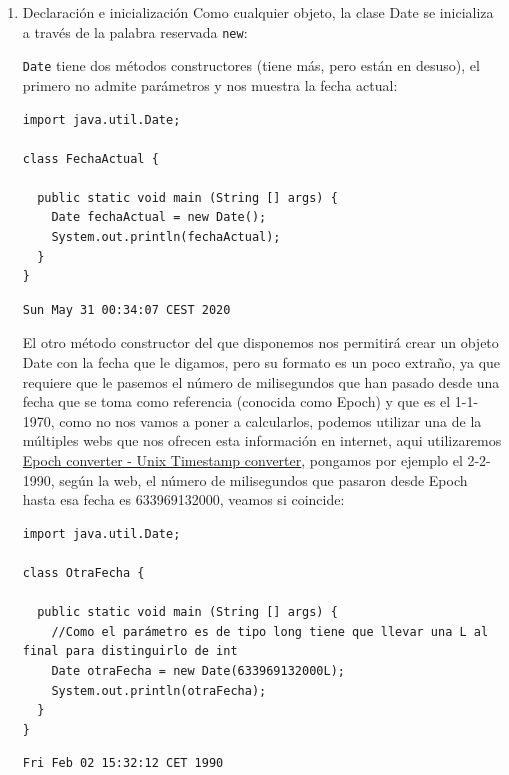 \documentclass[11pt]{article}
\begin{document}
\begin{enumerate}
\item Declaración e inicialización
\label{sec:orgd70eda4}
Como cualquier objeto, la clase Date se inicializa a través de la palabra reservada \texttt{new}:

\texttt{Date} tiene dos métodos constructores (tiene más, pero están en desuso), el primero no admite parámetros y nos muestra la fecha actual:

\begin{verbatim}
import java.util.Date;

class FechaActual {

  public static void main (String [] args) {
    Date fechaActual = new Date();
    System.out.println(fechaActual);
  }
}
\end{verbatim}

\begin{verbatim}
Sun May 31 00:34:07 CEST 2020
\end{verbatim}


El otro método constructor del que disponemos nos permitirá crear un objeto Date con la fecha que le digamos, pero su formato es un poco extraño, ya que requiere que le pasemos el número de milisegundos que han pasado desde una fecha que se toma como referencia (conocida como Epoch) y que es el 1-1-1970, como no nos vamos a poner a calcularlos, podemos utilizar una de la múltiples webs que nos ofrecen esta información en internet, aqui utilizaremos \href{https://www.epochconverter.com}{Epoch converter - Unix Timestamp converter}, pongamos por ejemplo el 2-2-1990, según la web, el número de milisegundos que pasaron desde Epoch hasta esa fecha es 633969132000, veamos si coincide:

\begin{verbatim}
import java.util.Date;

class OtraFecha {

  public static void main (String [] args) {
    //Como el parámetro es de tipo long tiene que llevar una L al final para distinguirlo de int
    Date otraFecha = new Date(633969132000L);
    System.out.println(otraFecha);
  }
}
\end{verbatim}

\begin{verbatim}
Fri Feb 02 15:32:12 CET 1990
\end{verbatim}


\end{enumerate}
\end{document}
